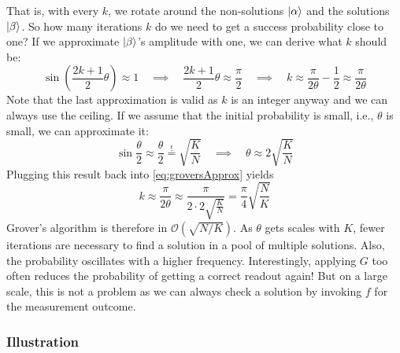 				That is, with every \(k\), we rotate around the non-solutions \(\ket{\alpha}\) and the solutions \(\ket{\beta}\). So how many iterations \(k\) do we need to get a success probability close to one? If we approximate \(\ket{\beta}\)'s amplitude with one, we can derive what \(k\) should be:
				\begin{equation}
					\sin(\frac{2k + 1}{2} \theta) \approx 1
					\quad\implies\quad
					\frac{2k + 1}{2} \theta \approx \frac{\pi}{2}
					\quad\implies\quad
					k \approx \frac{\pi}{2 \theta} - \frac{1}{2} \approx \frac{\pi}{2 \theta}
					\label{eq:groversApprox}
				\end{equation}
				Note that the last approximation is valid as \(k\) is an integer anyway and we can always use the ceiling. If we assume that the initial probability is small, i.e., \(\theta\) is small, we can approximate it:
				\begin{equation}
					\sin\frac{\theta}{2} \approx \frac{\theta}{2} \overset{!}{=} \sqrt{\frac{K}{N}}
					\quad\implies\quad
					\theta \approx 2 \sqrt{\frac{K}{N}}
				\end{equation}
				Plugging this result back into \eqref{eq:groversApprox} yields
				\begin{equation}
					k
					\approx \frac{\pi}{2 \theta}
					\approx \frac{\pi}{2 \cdot 2 \sqrt{\frac{K}{N}}}
					= \frac{\pi}{4} \sqrt{\frac{N}{K}}
				\end{equation}
				Grover's algorithm is therefore in \( \mathcal{O}(\sqrt{N / K}) \). As \(\theta\) gets scales with \(K\), fewer iterations are necessary to find a solution in a pool of multiple solutions. Also, the probability oscillates with a higher frequency. Interestingly, applying \(G\) too often reduces the probability of getting a correct readout again! But on a large scale, this is not a problem as we can always check a solution by invoking \(f\) for the measurement outcome.

			\subsubsection{Illustration}

